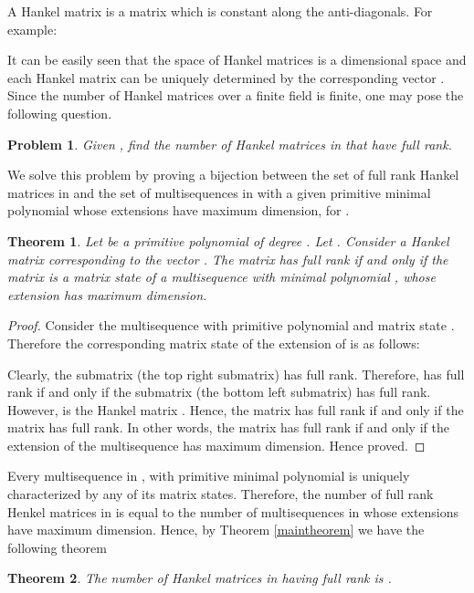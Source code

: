 \documentclass[letterpaper, 12 pt]{article}  \usepackage{amssymb}
\newtheorem{theorem}{Theorem}[section]
\newtheorem{problem}{Problem}
\begin{document}
A Hankel matrix is a matrix which is constant along the anti-diagonals. For
example:

 It can be easily seen that the space of  Hankel matrices is a
 dimensional space and each Hankel matrix can be uniquely determined by
the corresponding vector . 
Since the number of Hankel matrices over a finite field  is finite, one
may pose the following question.

\begin{problem}
Given , find the number of Hankel matrices in  that
have full rank.
\end{problem}

We solve this problem by proving a bijection between the set of full rank
Hankel matrices in  and the set of multisequences in 
with a given primitive minimal polynomial  whose extensions have
maximum dimension, for .

\begin{theorem}
Let  be a primitive polynomial of degree . Let .
Consider a Hankel matrix  corresponding to the vector . The matrix  has full rank
if and only if the matrix  is a matrix state of a
multisequence  with minimal polynomial , whose extension has
maximum dimension. 
\end{theorem}
\begin{proof}
Consider the multisequence  with primitive polynomial  and matrix state
 . Therefore the corresponding matrix state  of the extension of 
is as follows:


Clearly, the submatrix  (the top right
submatrix) has full rank. Therefore,  has full rank if and only if the
submatrix  (the bottom left submatrix) has full rank.
However,  is the Hankel matrix . Hence, the matrix 
has full rank if and only if the matrix  has full rank. In other words, the
matrix  has full rank if and only if the extension  of the multisequence
 has maximum dimension. Hence proved.
\end{proof}

Every multisequence  in , with primitive minimal polynomial 
is uniquely characterized by any of its matrix states. Therefore, the number of
full rank Henkel matrices in 
is equal to the number of multisequences in  whose extensions have
maximum dimension. Hence, by Theorem \ref{maintheorem} we have the following
theorem

\begin{theorem}
The number of Hankel matrices in  having full rank is
. 
\end{theorem}
 
\end{document}

